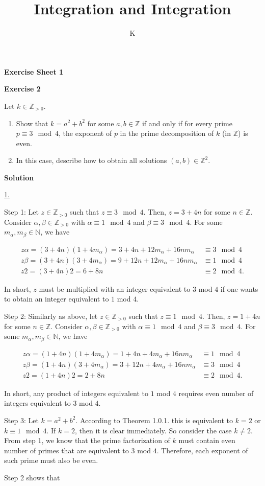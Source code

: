\documentclass[a4paper]{article}
\title{Integration and Integration}
\author{K}
\theoremstyle{definition}
\begin{document}
\begin{center}
    \noindent\textbf{Exercise Sheet 1}
\end{center}
\noindent\textbf{Exercise 2}

Let \(k \in \mathbb{Z}_{>0}\).
\begin{enumerate}
    \item Show that \(k = a^2 + b^2\) for some \(a, b \in \mathbb{Z}\) if and only if for every prime \(p \equiv 3 \mod 4\), the exponent of \(p\) in the prime decomposition of \(k\) (in \(\mathbb{Z}\)) is even.
    \item In this case, describe how to obtain all solutions \((a, b) \in \mathbb{Z}^2\).
\end{enumerate}

\noindent\textbf{Solution}

\noindent\underline{1.}

\noindent Step 1: Let \(z \in \mathbb{Z}_{>0}\) such that \(z \equiv 3 \mod{4}\). Then, \(z = 3 + 4n\) for some \(n \in \mathbb{Z}\). Consider \(\alpha, \beta \in \mathbb{Z}_{>0}\) with \(\alpha \equiv 1 \mod{4}\) and \(\beta \equiv 3 \mod{4}\). For some \(m_\alpha, m_\beta \in \mathbb{N}\), we have

\begin{align}
    z \alpha = (3 + 4n)(1 + 4m_\alpha) = 3 + 4n + 12m_\alpha + 16nm_\alpha &\equiv 3 \mod{4} \\
    z \beta = (3 + 4n)(3 + 4m_\alpha) = 9 + 12n + 12m_\alpha + 16nm_\alpha &\equiv 1 \mod{4} \\
    z 2 = (3 + 4n) 2 = 6 + 8n &\equiv 2 \mod{4} \text{.}
\end{align}

In short, \(z\) must be multiplied with an integer equivalent to \(3\) mod \(4\) if one wants to obtain an integer equivalent to \(1\) mod \(4\).

\noindent Step 2: Similarly as above, let \(z \in \mathbb{Z}_{>0}\) such that \(z \equiv 1 \mod{4}\). Then, \(z = 1 + 4n\) for some \(n \in \mathbb{Z}\). Consider \(\alpha, \beta \in \mathbb{Z}_{>0}\) with \(\alpha \equiv 1 \mod{4}\) and \(\beta \equiv 3 \mod{4}\). For some \(m_\alpha, m_\beta \in \mathbb{N}\), we have

\begin{align}
    z \alpha = (1 + 4n)(1 + 4m_\alpha) = 1 + 4n + 4m_\alpha + 16nm_\alpha &\equiv 1 \mod{4} \\
    z \beta = (1 + 4n)(3 + 4m_\alpha) = 3 + 12n + 4m_\alpha + 16nm_\alpha &\equiv 3 \mod{4} \\
    z 2 = (1 + 4n) 2 = 2 + 8n &\equiv 2 \mod{4} \text{.}
\end{align}

In short, any product of integers equivalent to \(1\) mod \(4\) requires even number of integers equivalent to \(3\) mod \(4\).

\noindent Step 3: Let \(k = a^2 + b^2\). According to Theorem 1.0.1. this is equivalent to \(k = 2\) or \(k \equiv 1 \mod{4}\). If \(k = 2\), then it is clear immediately. So consider the case \(k \neq 2\). From step 1, we know that the prime factorization of \(k\) must contain even number of primes that are equivalent to \(3\) mod \(4\). Therefore, each exponent of such prime must also be even.

\noindent Step 2 shows that 
\end{document}
